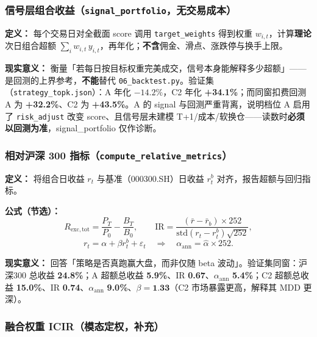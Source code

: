 \documentclass[UTF8,a4paper,12pt]{ctexart}
\begin{document}
\subsubsection{信号层组合收益（\texttt{signal\_portfolio}，无交易成本）}

\textbf{定义：} 每个交易日对全截面 score 调用 \texttt{target\_weights} 得到权重 $w_{i,t}$，计算\textbf{理论}次日组合超额 $\sum_i w_{i,t}\, y_{i,t}$，再年化；\textbf{不含}佣金、滑点、涨跌停与换手上限。

\textbf{现实意义：} 衡量「若每日按目标权重完美成交，信号本身能解释多少超额」——是回测的上界参考，\textbf{不能}替代 \texttt{06\_backtest.py}。验证集（\texttt{strategy\_topk.json}）：A 年化 \textbf{$-14.2\%$}，C2 年化 \textbf{+34.1\%}；而同窗扣费回测 A 为 \textbf{+32.2\%}、C2 为 \textbf{+43.5\%}。A 的 signal 与回测严重背离，说明档位 A 启用了 \texttt{risk\_adjust} 改变 score、且信号层未建模 T+1/成本/软换仓——读数时\textbf{必须以回测为准}，signal\_portfolio 仅作诊断。

\subsubsection{相对沪深 300 指标（\texttt{compute\_relative\_metrics}）}

\textbf{定义：} 将组合日收益 $r_t$ 与基准（000300.SH）日收益 $r_t^b$ 对齐，报告超额与回归指标。

\textbf{公式（节选）：}
\begin{equation}
  R_{\mathrm{exc,tot}} = \frac{P_T}{P_0} - \frac{B_T}{B_0},
  \qquad
  \mathrm{IR} = \frac{(\bar r-\bar r_b)\times 252}{\mathrm{std}(r_t-r_t^b)\sqrt{252}},
\end{equation}
\begin{equation}
  r_t = \alpha + \beta r_t^b + \varepsilon_t
  \quad\Rightarrow\quad
  \alpha_{\mathrm{ann}} = \hat\alpha \times 252.
\end{equation}

\textbf{现实意义：} 回答「策略是否真跑赢大盘，而非仅随 beta 波动」。验证集同窗：沪深300 总收益 \textbf{24.8\%}；A 超额总收益 \textbf{5.9\%}、IR \textbf{0.67}、$\alpha_{\mathrm{ann}}$ \textbf{5.4\%}；C2 超额总收益 \textbf{15.0\%}、IR \textbf{0.74}、$\alpha_{\mathrm{ann}}$ \textbf{9.0\%}、$\beta=\textbf{1.33}$（C2 市场暴露更高，解释其 MDD 更深）。

\subsubsection{融合权重 ICIR（模态定权，补充）}
\end{document}
